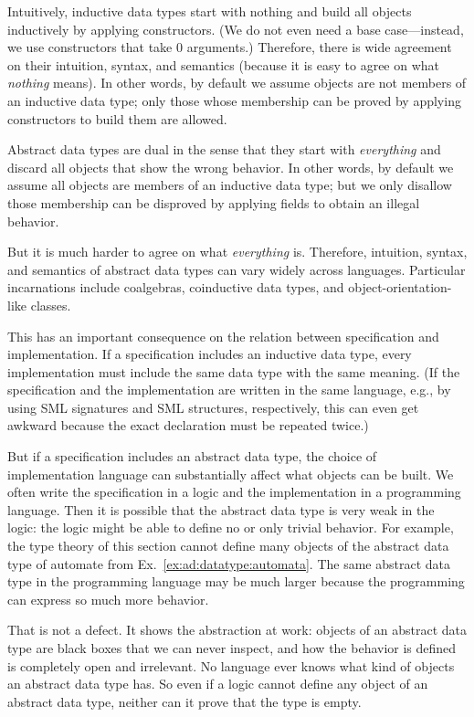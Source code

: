 \begin{remark}[Duality]\label{rem:ad:datatype:dual}
Intuitively, inductive data types start with nothing and build all objects inductively by applying constructors.
(We do not even need a base case---instead, we use constructors that take $0$ arguments.)
Therefore, there is wide agreement on their intuition, syntax, and semantics (because it is easy to agree on what \emph{nothing} means).
In other words, by default we assume objects are not members of an inductive data type; only those whose membership can be proved by applying constructors to build them are allowed.

Abstract data types are dual in the sense that they start with \emph{everything} and discard all objects that show the wrong behavior.
In other words, by default we assume all objects are members of an inductive data type; but we only disallow those membership can be disproved by applying fields to obtain an illegal behavior.

But it is much harder to agree on what \emph{everything} is.
Therefore, intuition, syntax, and semantics of abstract data types can vary widely across languages.
Particular incarnations include coalgebras, coinductive data types, and object-orientation-like classes.
\medskip

This has an important consequence on the relation between specification and implementation.
If a specification includes an inductive data type, every implementation must include the same data type with the same meaning.
(If the specification and the implementation are written in the same language, e.g., by using SML signatures and SML structures, respectively, this can even get awkward because the exact declaration must be repeated twice.)

But if a specification includes an abstract data type, the choice of implementation language can substantially affect what objects can be built.
We often write the specification in a logic and the implementation in a programming language.
Then it is possible that the abstract data type is very weak in the logic: the logic might be able to define no or only trivial behavior.
For example, the type theory of this section cannot define many objects of the abstract data type of automate from Ex.~\ref{ex:ad:datatype:automata}.
The same abstract data type in the programming language may be much larger because the programming can express so much more behavior.

That is not a defect.
It shows the abstraction at work: objects of an abstract data type are black boxes that we can never inspect, and how the behavior is defined is completely open and irrelevant.
No language ever knows what kind of objects an abstract data type has.
So even if a logic cannot define any object of an abstract data type, neither can it prove that the type is empty.
\end{remark}

